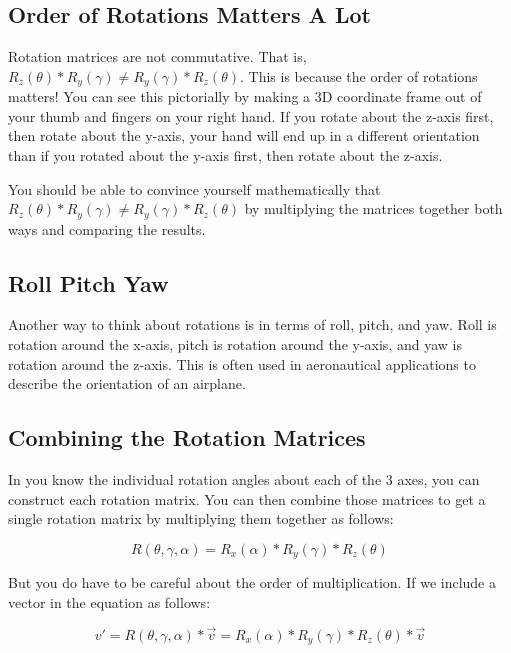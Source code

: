 \documentclass[11pt]{article}
\begin{document}
\subsection{Order of Rotations Matters A Lot}

Rotation matrices are not commutative.  That is, \( R_z(\theta) * R_y(\gamma) \neq R_y(\gamma) * R_z(\theta) \).
This is because the order of rotations matters!  You can see this pictorially by making
a 3D coordinate frame out of your thumb and fingers on your right hand.  If you rotate about
the z-axis first, then rotate about the y-axis, your hand will end up in a different orientation
than if you rotated about the y-axis first, then rotate about the z-axis.

You should be able to convince yourself mathematically that $R_z(\theta) * R_y(\gamma) \neq R_y(\gamma) * R_z(\theta)$ 
by multiplying the matrices together both ways and comparing the results.

\subsection{Roll Pitch Yaw}

Another way to think about rotations is in terms of roll, pitch, and yaw.  Roll is rotation
around the x-axis, pitch is rotation around the y-axis, and yaw is rotation around the z-axis.
This is often used in aeronautical applications to describe the orientation of an airplane.


\subsection{Combining the Rotation Matrices}

In you know the individual rotation angles about each of the 3 axes, you can construct
each rotation matrix.  You can then combine those matrices to get a single rotation matrix
by multiplying them together as follows:

\begin{equation}
    R(\theta, \gamma, \alpha) = R_x(\alpha) * R_y(\gamma) * R_z(\theta)
\end{equation}

But you do have to be careful about the order of multiplication.  If we include a vector
in the equation as follows:

\begin{equation}
    v' = R(\theta, \gamma, \alpha) * \vec{v} = R_x(\alpha) * R_y(\gamma) * R_z(\theta) * \vec{v}
\end{equation}
\end{document}
